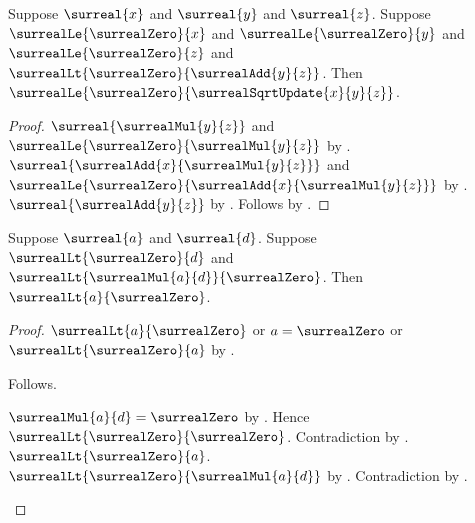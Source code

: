 \begin{proposition}\label{surreal_sqrt_update_nonnegative}
    Suppose $\surreal{x}$ and $\surreal{y}$ and $\surreal{z}$.
    Suppose $\surrealLe{\surrealZero}{x}$ and
        $\surrealLe{\surrealZero}{y}$ and
        $\surrealLe{\surrealZero}{z}$ and
        $\surrealLt{\surrealZero}{\surrealAdd{y}{z}}$.
    Then $\surrealLe{\surrealZero}{\surrealSqrtUpdate{x}{y}{z}}$.
\end{proposition}
\begin{proof}
    $\surreal{\surrealMul{y}{z}}$ and
        $\surrealLe{\surrealZero}{\surrealMul{y}{z}}$
        by .
    $\surreal{\surrealAdd{x}{\surrealMul{y}{z}}}$ and
        $\surrealLe{\surrealZero}{
            \surrealAdd{x}{\surrealMul{y}{z}}}$
        by .
    $\surreal{\surrealAdd{y}{z}}$
        by .
    Follows by
        .
\end{proof}

\begin{lemma}\label{surreal_mul_positive_right_negative_elim}
    Suppose $\surreal{a}$ and $\surreal{d}$.
    Suppose $\surrealLt{\surrealZero}{d}$ and
        $\surrealLt{\surrealMul{a}{d}}{\surrealZero}$.
    Then $\surrealLt{a}{\surrealZero}$.
\end{lemma}
\begin{proof}
    $\surrealLt{a}{\surrealZero}$ or $a=\surrealZero$ or
        $\surrealLt{\surrealZero}{a}$
        by .
    \begin{byCase}
            Follows.
            \begin{byCase}
                    $\surrealMul{a}{d}=\surrealZero$
                        by .
                    Hence $\surrealLt{\surrealZero}{\surrealZero}$.
                    Contradiction by
                        .
                    $\surrealLt{\surrealZero}{a}$.
                    $\surrealLt{\surrealZero}{\surrealMul{a}{d}}$
                        by .
                    Contradiction by
                        .
            \end{byCase}
    \end{byCase}
\end{proof}

